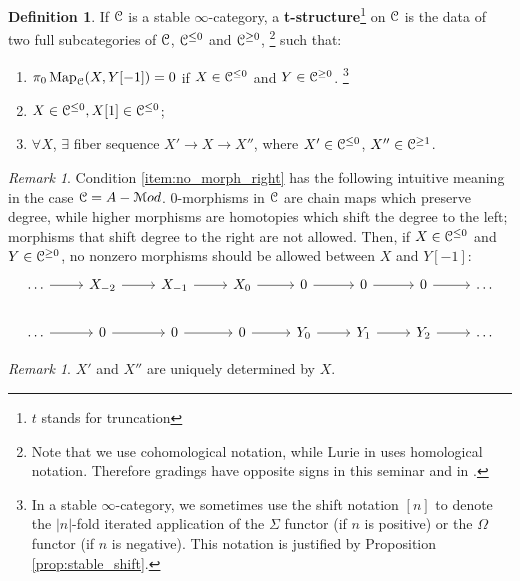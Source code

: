 \documentclass[10pt,a4paper,reqno,oneside]{book} %
\theoremstyle{plain}
\theoremstyle{definition}
\newtheorem{defin}[thm]{Definition}
\theoremstyle{remark}
\newtheorem{rem}[thm]{Remark}
\numberwithin{equation}{section}
\begin{document}
\begin{defin}
If $\mathcal C$ is a stable $\infty$-category, a \textbf{t-structure}\footnote{$t$ stands for truncation} on 
$\mathcal C$ is the data of two full subcategories of $\mathcal C$, $\mathcal C^{\leq 0}$ and
$\mathcal C^{\geq 0}$, \footnote{Note that we use cohomological notation, while Lurie in \cite{Lurie_Higher_algebra} uses homological
notation. Therefore gradings have opposite signs in this seminar and in \cite{Lurie_Higher_algebra}.} such that:

\begin{enumerate}
\item \label{item:no_morph_right}
$\pi_0 \operatorname{Map}_{\mathcal C}(X,Y[-1]) = 0$ if $X \in \mathcal C^{\leq 0}$ and $Y \in \mathcal C^{\geq 0}$.
\footnote{In a stable $\infty$-category, we sometimes use the shift notation $[n]$ to denote the $|n|$-fold iterated application
of the $\Sigma$ functor (if $n$ is positive) or the $\Omega$ functor (if $n$ is negative). This notation is justified by
Proposition \ref{prop:stable_shift}.}

\item $X \in \mathcal C^{\leq 0}, X[1]  \in \mathcal C^{\leq 0}$;

\item \label{item:fiber_seq}
$\forall X$, $\exists$ fiber sequence $X' \to X \to X''$, where $X' \in \mathcal C^{\leq 0}$, $X'' \in \mathcal C^{\geq 1}$.
\end{enumerate}
\end{defin}

\begin{rem}
Condition \ref{item:no_morph_right} has the following intuitive meaning in the case $\mathcal C = A-\mathcal M od$. $0$-morphisms in 
$\mathcal C$ are chain maps which preserve degree, while
higher morphisms are homotopies which shift the degree to the left; morphisms that shift degree to the right are not allowed.
Then, if $X \in \mathcal C^{\leq 0}$ and $Y \in \mathcal C^{\geq 0}$, no nonzero morphisms should be allowed between $X$ and $Y[-1]$:
\[
\begin{tikzcd}
\dots \arrow{r} & X_{-2} \arrow{r} & X_{-1} \arrow{r} & X_0 \arrow{r} & 0\arrow{r} & 0\arrow{r} & 0\arrow{r} & \dots \\
\dots \arrow{r} & 0 \arrow{r} & 0 \arrow{r} & 0 \arrow{r} & Y_0\arrow{r} & Y_1\arrow{r} & Y_2\arrow{r}  & \dots
\end{tikzcd}
\]
\end{rem}

\begin{rem}
$X'$ and $X''$ are uniquely determined by $X$.
\end{rem}
\end{document}
